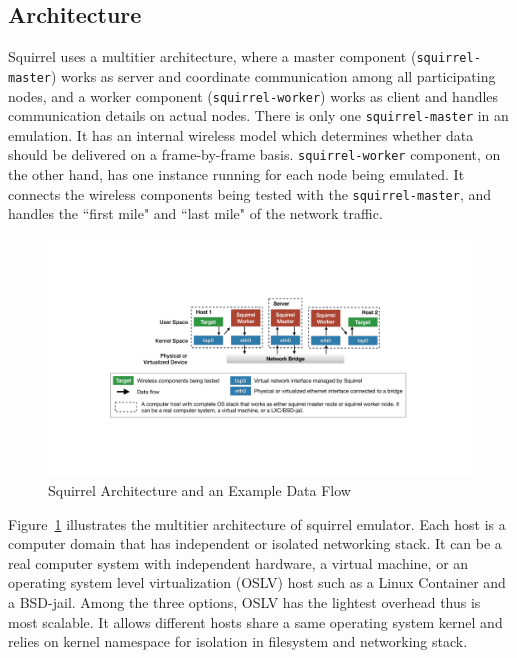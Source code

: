 \documentclass[12pt]{report}
\begin{document}
\subsection{Architecture}
Squirrel uses a multitier architecture, where a master component (\texttt{squirrel-master}) works as server and coordinate communication among all participating nodes, and a worker component (\texttt{squirrel-worker}) works as client and handles communication details on actual nodes. There is only one \texttt{squirrel-master} in an emulation. It has an internal wireless model which determines whether data should be delivered on a frame-by-frame basis. \texttt{squirrel-worker} component, on the other hand, has one instance running for each node being emulated. It connects the wireless components being tested with the \texttt{squirrel-master}, and handles the ``first mile" and ``last mile" of the network traffic.

\begin{figure}[h]
  \begin{center}
    \includegraphics[width=\textwidth]{figures/squirrelArch.pdf}
    \caption{\label{fig:squirrel_arch}Squirrel Architecture and an Example Data Flow}
  \end{center}
\end{figure}

Figure~\ref{fig:squirrel_arch} illustrates the multitier architecture of squirrel emulator. Each host is a computer domain that has independent or isolated networking stack. It can be a real computer system with independent hardware, a virtual machine, or an operating system level virtualization (OSLV) host such as a Linux Container and a BSD-jail. Among the three options, OSLV has the lightest overhead thus is most scalable. It allows different hosts share a same operating system kernel and relies on kernel namespace for isolation in filesystem and networking stack.
\end{document}

